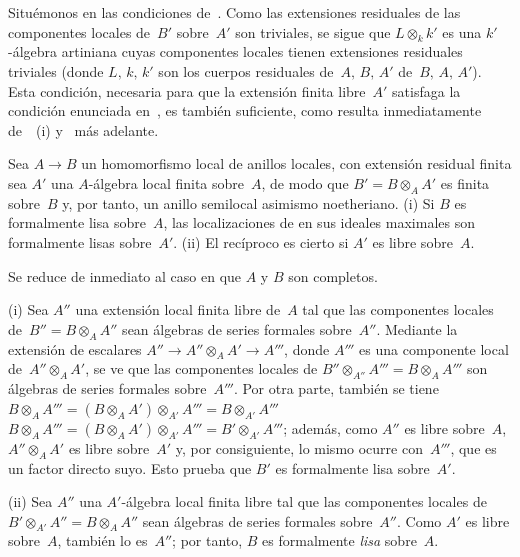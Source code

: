 \medskip
Situémonos en las condiciones de~. Como las extensiones
residuales de las componentes locales de~$B'$ sobre~$A'$ son triviales, se sigue que $L\otimes_k k'$ es una $k'$-álgebra artiniana cuyas componentes locales tienen extensiones residuales triviales (donde $L,\,k,\,k'$ son los cuerpos residuales
{de~$A,\,B,\,A'$}
{de~$B,\,A,\,A'$}).
Esta condición, necesaria para que la extensión finita libre~$A'$ satisfaga la condición enunciada en~, es también suficiente, como resulta inmediatamente de~~(i) y~ más adelante.

\begin{proposition}
\label{III.1.4}
Sea $A\to B$ un homomorfismo local de anillos locales, con extensión residual finita
sea $A'$ una $A$-álgebra local finita sobre~$A$, de modo que $B'=B\otimes_A A'$ es finita sobre~$B$ y, por tanto, un anillo semilocal asimismo noetheriano. \textup{(i)} Si $B$ es formalmente lisa sobre~$A$, las localizaciones de
en sus ideales maximales son formalmente lisas sobre~$A'$. \textup{(ii)} El recíproco es cierto si $A'$ es libre sobre~$A$.
\end{proposition}

Se reduce de inmediato al caso en que $A$ y $B$ son completos.

(i) Sea $A''$ una extensión local finita libre de~$A$ tal que las componentes locales de~$B''=B\otimes_A A''$ sean álgebras de series formales sobre~$A''$. Mediante la extensión de escalares $A''\to A''\otimes_A A'\to A'''$, donde $A'''$ es una componente local de~$A''\otimes_A A'$, se ve que las componentes locales de $B''\otimes_{A''}A'''=B\otimes_A A'''$ son álgebras de series formales sobre~$A'''$. Por otra parte, también se tiene
{$B\otimes_AA'''=(B\otimes_A A')\otimes_{A'}A'''=B\otimes_{A'}A'''$}
{$B\otimes_AA'''=(B\otimes_A A')\otimes_{A'}A'''=B'\otimes_{A'}A'''$};
además, como $A''$ es libre sobre~$A$, $A''\otimes_A A'$ es libre sobre~$A'$ y, por consiguiente, lo mismo ocurre con~$A'''$, que es un factor directo suyo. Esto prueba que $B'$ es formalmente lisa sobre~$A'$.

(ii) Sea $A''$ una $A'$-álgebra local finita libre tal que las componentes locales de~$B'\otimes_{A'}A''=B\otimes_A A''$ sean álgebras de series formales sobre~$A''$. Como $A'$ es libre sobre~$A$, también lo es~$A''$; por tanto, $B$ es formalmente \emph{lisa} sobre~$A$.
